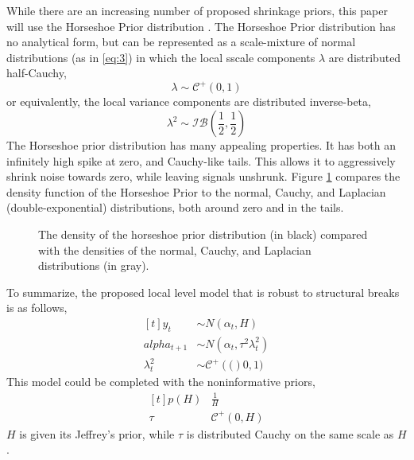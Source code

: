 \documentclass{article}
\newcommand{\paren}[1]{\ensuremath{\left(#1\right)}}
\newcommand{\dhalfcauchy}[1]{\ensuremath{\mathcal{C}^{+}\paren{#1}}}
\newcommand{\dinvbeta}[1]{\ensuremath{\mathcal{IB}\paren{#1}}}
\begin{document}
While there are an increasing number of proposed shrinkage priors, this paper will use the Horseshoe Prior distribution \parencites{CarvalhoPolsonScott2009}{CarvalhoPolsonScott2010}{PolsonScott2010}{PolsonScott2012}{DattaGhosh2012}.
The Horseshoe Prior distribution has no analytical form, but can be represented as a scale-mixture of normal distributions (as in \eqref{eq:3}) in which the local sscale components $\lambda$ are distributed half-Cauchy,
\begin{equation}
  \label{eq:6}
  \lambda \sim \dhalfcauchy{0, 1}
\end{equation}
or equivalently, the local variance components are distributed inverse-beta,
\begin{equation}
  \label{eq:9}
  \lambda^{2} \sim \dinvbeta{\frac{1}{2}, \frac{1}{2}}
\end{equation}
The Horseshoe prior distribution has many appealing properties.
It has both an infinitely high spike at zero, and Cauchy-like tails.
This allows it to aggressively shrink noise towards zero, while leaving signals unshrunk.
Figure \ref{fig:horseshoe} compares the density function of the Horseshoe Prior to the normal, Cauchy, and Laplacian (double-exponential) distributions, both around zero and in the tails.
\begin{figure}
  \centering
  \caption{The density of the horseshoe prior distribution (in black) compared with the densities of the normal, Cauchy, and Laplacian distributions (in gray).}
  \label{fig:horseshoe}
\end{figure}

To summarize, the proposed local level model that is robust to structural breaks is as follows,
\begin{equation}
  \label{eq:10}
  \begin{aligned}[t]
    y_{t} &\sim N(\alpha_{t}, H) \\
    alpha_{t + 1} &\sim N(\alpha_{t}, \tau^{2} \lambda^{2}_{t}) \\
    \lambda^{2}_{t} & \sim \dhalfcauchy(0, 1) 
  \end{aligned}
\end{equation}
This model could be completed with the noninformative priors,
\begin{equation}
  \label{eq:7}
  \begin{aligned}[t]
    p(H) & \frac{1}{H} \\
    \tau & \dhalfcauchy{0, H}
  \end{aligned}
\end{equation}
$H$ is given its Jeffrey's prior, while $\tau$ is distributed Cauchy on the same scale as $H$.
\end{document}
